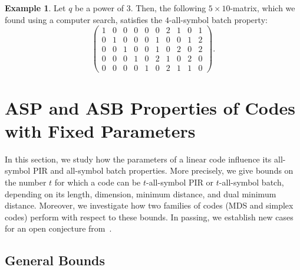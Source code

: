 \documentclass[11pt,a4paper]{article}
\theoremstyle{definition}
\newtheorem{example}[theorem]{Example}
\begin{document}
\begin{example}\label{ex:asp(5,4,3)}
Let $q$ be a power of $3$. Then, the following $5 \times 10$-matrix, which we found using a computer search, satisfies the $4$-all-symbol batch property:
$$
\left(
\begin{array}{ccccc|ccccc}
    1 & 0 & 0 & 0 & 0  & 0 & 2 & 1 & 0 & 1 \\
    0 & 1 & 0 & 0 & 0  & 1 & 0 & 0 & 1 & 2 \\
    0 & 0 & 1 & 0 & 0  & 1 & 0 & 2 & 0 & 2 \\
    0 & 0 & 0 & 1 & 0  & 2 & 1 & 0 & 2 & 0 \\
    0 & 0 & 0 & 0 & 1  & 0 & 2 & 1 & 1 & 0 
\end{array}
\right).
$$
\end{example}

\section{ASP and ASB Properties of Codes with Fixed Parameters}\label{Sec:Propetries_Of_Known_Codes}


In this section, we study how the parameters of a linear code influence its all-symbol PIR and all-symbol batch properties. More precisely, we give bounds on the number $t$ for which a code can be $t$-all-symbol PIR or $t$-all-symbol batch, depending on its length, dimension, minimum distance, and dual minimum distance. Moreover, we investigate how two families of codes (MDS and simplex codes) perform with respect to these bounds. In passing, we establish new cases for an open conjecture from~\cite{YAAKOBI2020}.

\subsection{General Bounds}
\end{document}
